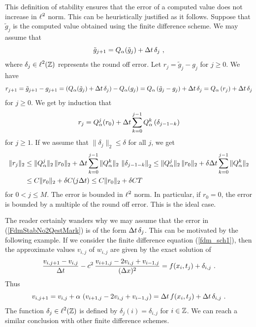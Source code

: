 This definition of stability ensures that the error of a computed
value does not increase in $\displaystyle \ell^2$ norm.  This can be
heuristically justified as it follows.  Suppose that $\tilde{g}_j$ is
the computed value obtained using the finite difference scheme.  We
may assume that
\begin{equation}\label{FdmStabNo2QestMark}
  \tilde{g}_{j+1} = Q_\alpha(\tilde{g}_j) + \dtx{t}\, \delta_j \ ,
\end{equation}
where $\displaystyle \delta_j \in \ell^2(\mathbb{Z})$ represents the round off error.
Let $r_j = \tilde{g}_j - g_j$ for $j\geq 0$.  We have
\[
r_{j+1} = \tilde{g}_{j+1} - g_{j+1}
= \left( Q_\alpha (\tilde{g}_j) + \Delta{t} \, \delta_j \right) - Q_\alpha (g_j)
= Q_\alpha \left( \tilde{g}_j - g_j\right)+ \Delta{t} \, \delta_j
= Q_\alpha \left(r_j\right) + \Delta{t} \, \delta_j
\]
for $j\geq 0$.  We get by induction that
\[
r_j = Q_\alpha^j (r_0)
+ \Delta{t} \sum_{k=0}^{j-1} Q_\alpha^k \left(\delta_{j-1-k}\right)
\]
for $j \geq 1$.  If we assume that $\|\delta_j\|_2 \leq \delta$
for all $j$, we get
\begin{align*}
\|r_j\|_2 & \leq \| Q_\alpha^j\|_2 \, \|r_0\|_2
+ \Delta{t} \sum_{k=0}^{j-1} \|Q_\alpha^k\|_2\, \left\|\delta_{j-1-k}\right\|_2
\leq \| Q_\alpha^j\|_2 \, \|r_0\|_2
+ \delta  \Delta{t} \sum_{k=0}^{j-1} \|Q_\alpha^k\|_2 \\
&\leq C \|r_0\|_2 + \delta C (j \Delta{t})
\leq C \|r_0\|_2 + \delta C T
\end{align*}
for $0 < j \leq M$.  The error is bounded in $\displaystyle \ell^2$ norm.  In
particular, if $r_0 = 0$, the error is bounded by a
multiple of the round off error.  This is the ideal case.

\begin{rmk}
The reader certainly wanders why we may assume that the error in
(\ref{FdmStabNo2QestMark}) is of the form $\Delta{t}\, \delta_j$.
This can be motivated by the following example.  If we consider the
finite difference equation (\ref{fdm_sch1}), then the approximate
values $v_{i,j}$ of $w_{i,j}$ are given by the exact solution of
\[
\frac{v_{i,j+1}- v_{i,j}}{\Delta{t}} - c^2 \,
\frac{v_{i+1,j} - 2v_{i,j} + v_{i-1,j}}{(\Delta{x})^2}
= f(x_i,t_j) + \delta_{i,j} \ .
\]
Thus
\[
v_{i,j+1}= v_{i,j} + \alpha \,
\left( v_{i+1,j} - 2v_{i,j} + v_{i-1,j}\right) = \Delta{t}\,f(x_i,t_j)
+ \Delta{t}\, \delta_{i,j} \ .
\]
The function $\displaystyle \delta_j \in \ell^2(\mathbb{Z})$ is defined by
$\delta_j(i) = \delta_{i,j}$ for $i \in \mathbb{Z}$.
We can reach a similar conclusion with other finite difference schemes.
\end{rmk}

